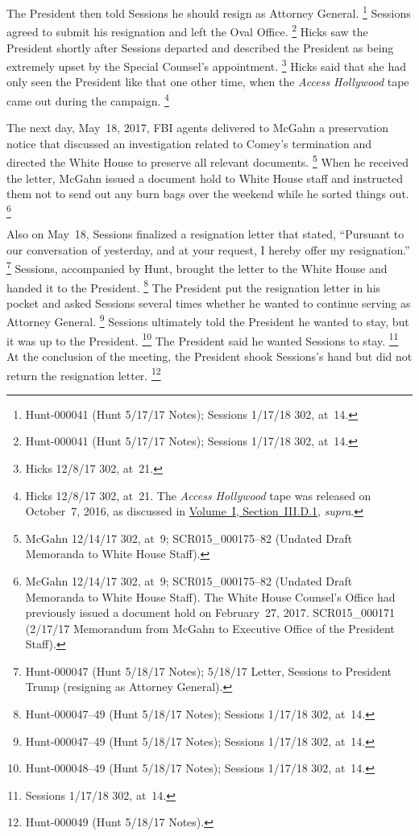 The President then told Sessions he should resign as Attorney General.%
\footnote{Hunt-000041 (Hunt 5/17/17 Notes);
Sessions 1/17/18 302, at~14.}
Sessions agreed to submit his resignation and left the Oval Office.%
\footnote{Hunt-000041 (Hunt 5/17/17 Notes);
Sessions 1/17/18 302, at~14.}
Hicks saw the President shortly after Sessions departed and described the President as being extremely upset by the Special Counsel's appointment.%
\footnote{Hicks 12/8/17 302, at~21.}
Hicks said that she had only seen the President like that one other time, when the \textit{Access Hollywood} tape came out during the campaign.%
\footnote{Hicks 12/8/17 302, at~21.
The \textit{Access Hollywood} tape was released on October~7, 2016, as discussed in \hyperlink{subsubsection.1.3.4.1}{Volume~I, Section~III.D.1}, \textit{supra}.}

The next day, May~18, 2017, FBI agents delivered to McGahn a preservation notice that discussed an investigation related to Comey's termination and directed the White House to preserve all relevant documents.%
\footnote{McGahn 12/14/17 302, at~9;
SCR015\_000175--82 (Undated Draft Memoranda to White House Staff).}
When he received the letter, McGahn issued a document hold to White House staff and instructed them not to send out any burn bags over the weekend while he sorted things out.%
\footnote{McGahn 12/14/17 302, at~9;
SCR015\_000175--82 (Undated Draft Memoranda to White House Staff).
The White House Counsel's Office had previously issued a document hold on February~27, 2017.
SCR015\_000171 (2/17/17 Memorandum from McGahn to Executive Office of the President Staff).}

Also on May~18, Sessions finalized a resignation letter that stated, ``Pursuant to our conversation of yesterday, and at your request, I hereby offer my resignation.''%
\footnote{Hunt-000047 (Hunt 5/18/17 Notes); 5/18/17 Letter, Sessions to President Trump (resigning as Attorney General).}
Sessions, accompanied by Hunt, brought the letter to the White House and handed it to the President.%
\footnote{Hunt-000047--49 (Hunt 5/18/17 Notes);
Sessions 1/17/18 302, at~14.}
The President put the resignation letter in his pocket and asked Sessions several times whether he wanted to continue serving as Attorney General.%
\footnote{Hunt-000047--49 (Hunt 5/18/17 Notes);
Sessions 1/17/18 302, at~14.}
Sessions ultimately told the President he wanted to stay, but it was up to the President.%
\footnote{Hunt-000048--49 (Hunt 5/18/17 Notes);
Sessions 1/17/18 302, at~14.}
The President said he wanted Sessions to stay.%
\footnote{Sessions 1/17/18 302, at~14.}
At the conclusion of the meeting, the President shook Sessions's hand but did not return the resignation letter.%
\footnote{Hunt-000049 (Hunt 5/18/17 Notes).}

